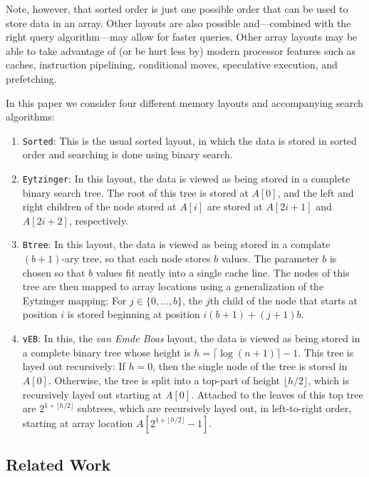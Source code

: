 \documentclass{patmorin}
\begin{document}
Note, however, that sorted order is just one possible order that can
be used to store data in an array. Other layouts are also possible
and---combined with the right query algorithm---may allow for faster
queries.  Other array layouts may be able to take advantage of (or be
hurt less by) modern processor features such as caches, instruction
pipelining, conditional moves, speculative execution, and prefetching.

In this paper we consider four different memory layouts and accompanying
search algorithms:

\begin{enumerate}
\item \texttt{Sorted}:  This is the usual sorted layout, in which the data is stored in sorted order and searching is done using binary search.

\item \texttt{Eytzinger}: In this layout, the data is viewed as being
stored in a complete binary search tree.  The root of this tree is stored
at $A[0]$, and the left and right children of the node stored at $A[i]$
are stored at $A[2i+1]$ and $A[2i+2]$, respectively.

\item \texttt{Btree}: In this layout, the data is viewed as being stored
in a complate $(b+1)$-ary tree, so that each node stores $b$ values.
The parameter $b$ is chosen so that $b$ values fit neatly into a
single cache line. The nodes of this tree are then mapped to array
locations using a generalization of the Eytzinger mapping:  For $j\in
\{0,\ldots,b\}$, the $j$th child of the node that starts at position $i$
is stored beginning at position $i(b+1)+(j+1)b$.

\item \texttt{vEB}: In this, the \emph{van Emde Boas} layout, the data
is viewed as being stored in a complete binary tree whose height is
$h=\lceil\log (n+1)\rceil -1$. This tree is layed out recursively:  If $h=0$,
then the single node of the tree is stored in $A[0]$.  Otherwise, the tree is split into a top-part of height $\lfloor h/2\rfloor$, which is recursively layed out starting at $A[0]$.  Attached to the leaves of this top tree are $2^{1+\lfloor{h/2\rfloor}}$ subtrees, which are recursively layed out, in left-to-right order, starting at array location $A[2^{1+\lfloor{h/2\rfloor}}-1]$.
\end{enumerate}


\subsection{Related Work}
\end{document}

